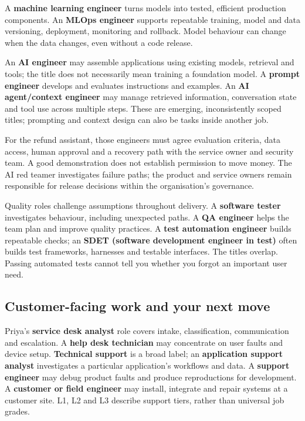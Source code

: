 A \textbf{machine learning engineer} turns models into tested, efficient production components. An \textbf{MLOps engineer} supports repeatable training, model and data versioning, deployment, monitoring and rollback. Model behaviour can change when the data changes, even without a code release. \autocite{google-mlops-roles}


An \textbf{AI engineer} may assemble applications using existing models, retrieval and tools; the title does not necessarily mean training a foundation model. A \textbf{prompt engineer} develops and evaluates instructions and examples. An \textbf{AI agent/context engineer} may manage retrieved information, conversation state and tool use across multiple steps. These are emerging, inconsistently scoped titles; prompting and context design can also be tasks inside another job. \autocite{anthropic-context-roles}


For the refund assistant, those engineers must agree evaluation criteria, data access, human approval and a recovery path with the service owner and security team. A good demonstration does not establish permission to move money. The AI red teamer investigates failure paths; the product and service owners remain responsible for release decisions within the organisation's governance.


Quality roles challenge assumptions throughout delivery. A \textbf{software tester} investigates behaviour, including unexpected paths. A \textbf{QA engineer} helps the team plan and improve quality practices. A \textbf{test automation engineer} builds repeatable checks; an \textbf{SDET (software development engineer in test)} often builds test frameworks, harnesses and testable interfaces. The titles overlap. Passing automated tests cannot tell you whether you forgot an important user need.



\subsection{Customer-facing work and your next move}


Priya's \textbf{service desk analyst} role covers intake, classification, communication and escalation. A \textbf{help desk technician} may concentrate on user faults and device setup. \textbf{Technical support} is a broad label; an \textbf{application support analyst} investigates a particular application's workflows and data. A \textbf{support engineer} may debug product faults and produce reproductions for development. A \textbf{customer or field engineer} may install, integrate and repair systems at a customer site. L1, L2 and L3 describe support tiers, rather than universal job grades.


